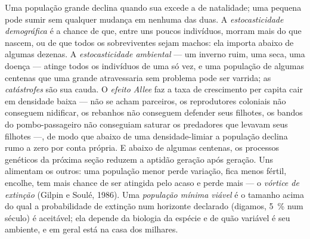 \begin{definition}\label{def:b3:conservation-biology:small}
Uma população grande declina quando sua  excede a de
natalidade; uma pequena pode sumir sem qualquer mudança em nenhuma das
duas. A \emph{estocasticidade demográfica} é a chance de que, entre uns
poucos indivíduos, morram mais do que nascem, ou de que todos os
sobreviventes sejam machos: ela importa abaixo de algumas dezenas. A
\emph{estocasticidade ambiental} --- um inverno ruim, uma seca, uma
doença --- atinge todos os indivíduos de uma só vez, e uma população de
algumas centenas que uma grande atravessaria sem problema pode ser
varrida; as \emph{catástrofes} são sua cauda. O \emph{efeito Allee} faz a
taxa de crescimento per capita cair em densidade baixa --- não se acham
parceiros, os reprodutores coloniais não conseguem nidificar, os rebanhos
não conseguem defender seus filhotes, os bandos do pombo-passageiro não
conseguiam saturar os predadores que levavam seus filhotes ---, de modo
que abaixo de uma densidade-limiar a população declina rumo a zero por
conta própria. E abaixo de algumas centenas, os processos genéticos da
próxima seção reduzem a aptidão geração após geração. Uns alimentam os
outros: uma população menor perde variação, fica menos fértil, encolhe,
tem mais chance de ser atingida pelo acaso e perde mais --- o
\emph{vórtice de extinção} (Gilpin e Soulé, 1986). Uma \emph{população
mínima viável} é o tamanho acima do qual a probabilidade de extinção num
horizonte declarado (digamos, \qty{5}{\%} num século) é aceitável; ela
depende da biologia da espécie e de quão variável é seu ambiente, e em
geral está na casa dos milhares.
\end{definition}

